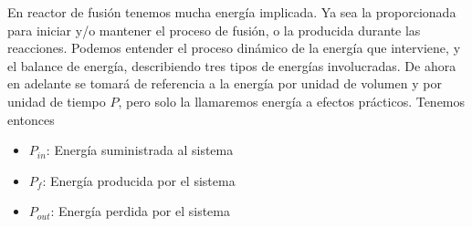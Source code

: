\documentclass[../main.tex]{subfiles}
\begin{document}
        En reactor de fusión tenemos mucha energía implicada. Ya sea la proporcionada para iniciar y/o mantener el proceso de fusión, o la producida durante las reacciones. Podemos entender el proceso dinámico de la energía que interviene, y el balance de energía, describiendo tres tipos de energías involucradas.
        De ahora en adelante se tomará de referencia a la energía por unidad de volumen y por unidad de tiempo $P$, pero solo la llamaremos energía a efectos prácticos. Tenemos entonces

        \begin{itemize}

            \item $P_{in}$: Energía suministrada al sistema 
            \item $P_{f}$: Energía producida por el sistema 
            \item $P_{out}$: Energía perdida por el sistema 

        \end{itemize}
\end{document}

